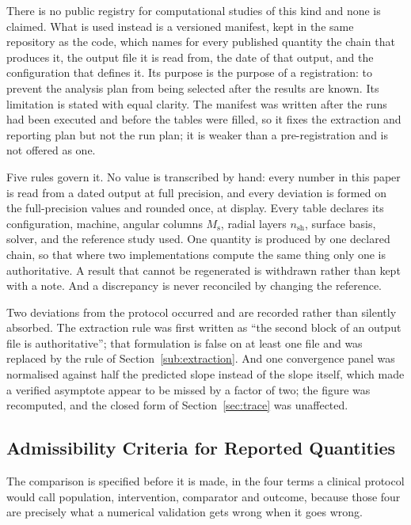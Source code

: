\documentclass[10pt,a4paper,twocolumn]{article}
\theoremstyle{plain}
\theoremstyle{remark}
\begin{document}
There is no public registry for computational studies of this kind and
none is claimed. What is used instead is a versioned manifest, kept in
the same repository as the code, which names for every published
quantity the chain that produces it, the output file it is read from,
the date of that output, and the configuration that defines it. Its
purpose is the purpose of a registration: to prevent the analysis plan
from being selected after the results are known. Its limitation is
stated with equal clarity. The manifest was written after the runs had
been executed and before the tables were filled, so it fixes the
extraction and reporting plan but not the run plan; it is weaker than a
pre-registration and is not offered as one.

Five rules govern it. No value is transcribed by hand: every number in
this paper is read from a dated output at full precision, and every
deviation is formed on the full-precision values and rounded once, at
display. Every table declares its configuration, machine, angular
columns $M_{\mathrm{s}}$, radial layers $n_{\mathrm{sh}}$, surface
basis, solver, and the reference study used. One quantity is produced by
one declared chain, so that where two implementations compute the same
thing only one is authoritative. A result that cannot be regenerated is
withdrawn rather than kept with a note. And a discrepancy is never
reconciled by changing the reference.

Two deviations from the protocol occurred and are recorded rather than
silently absorbed. The extraction rule was first written as ``the second
block of an output file is authoritative''; that formulation is false on
at least one file and was replaced by the rule of
Section~\ref{sub:extraction}. And one convergence panel was normalised
against half the predicted slope instead of the slope itself, which
made a verified asymptote appear to be missed by a factor of two; the
figure was recomputed, and the closed form of Section~\ref{sec:trace}
was unaffected.

\subsection{Admissibility Criteria for Reported Quantities}
\label{sub:eligibility}

The comparison is specified before it is made, in the four terms a
clinical protocol would call population, intervention, comparator and
outcome, because those four are precisely what a numerical validation
gets wrong when it goes wrong.
\end{document}

